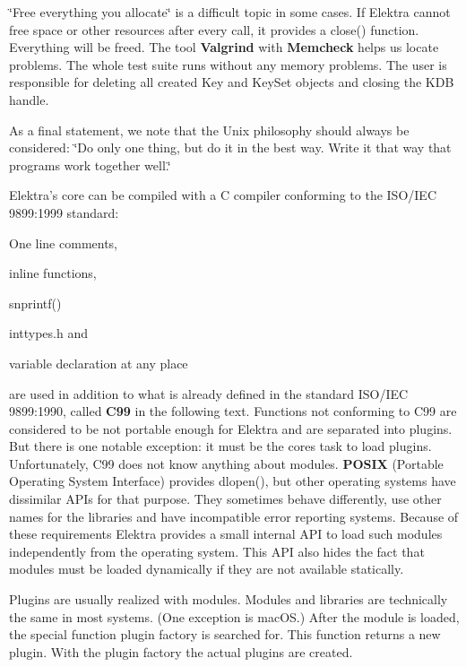 \char`\"{}\+Free everything you allocate\char`\"{} is a difficult topic in some cases. If Elektra cannot free space or other resources after every call, it provides a {\ttfamily close()} function. Everything will be freed. The tool {\bfseries Valgrind} with {\bfseries Memcheck} helps us locate problems. The whole test suite runs without any memory problems. The user is responsible for deleting all created {\ttfamily Key} and {\ttfamily Key\+Set} objects and closing the {\ttfamily K\+DB} handle.

As a final statement, we note that the Unix philosophy should always be considered\+: \char`\"{}\+Do only one thing, but do it in the best way. Write it
that way that programs work together well.\char`\"{}

Elektra’s core can be compiled with a C compiler conforming to the I\+S\+O/\+I\+EC 9899\+:1999 standard\+:


\begin{DoxyItemize}
\item One line comments,
\item inline functions,
\item {\ttfamily snprintf()}
\item inttypes.\+h and
\item variable declaration at any place
\end{DoxyItemize}

are used in addition to what is already defined in the standard I\+S\+O/\+I\+EC 9899\+:1990, called {\bfseries C99} in the following text. Functions not conforming to C99 are considered to be not portable enough for Elektra and are separated into plugins. But there is one notable exception\+: it must be the core\textquotesingle{}s task to load plugins. Unfortunately, C99 does not know anything about modules. {\bfseries P\+O\+S\+IX} (Portable Operating System Interface) provides {\ttfamily dlopen()}, but other operating systems have dissimilar A\+P\+Is for that purpose. They sometimes behave differently, use other names for the libraries and have incompatible error reporting systems. Because of these requirements Elektra provides a small internal A\+PI to load such modules independently from the operating system. This A\+PI also hides the fact that modules must be loaded dynamically if they are not available statically.

Plugins are usually realized with modules. Modules and libraries are technically the same in most systems. (One exception is mac\+OS.) After the module is loaded, the special function plugin factory is searched for. This function returns a new plugin. With the plugin factory the actual plugins are created.


